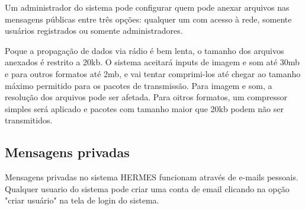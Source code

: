 \documentclass[11pt,a4paper]{article}
\begin{document}
Um administrador do sistema pode configurar quem pode anexar arquivos nas mensagens públicas entre três opções: qualquer um com acesso à rede, somente usuários registrados ou somente administradores.



Poque a propagação de dados via rádio é bem lenta, o tamanho dos arquivos anexados é restrito a 20kb. O sistema aceitará inputs de imagem e som até 30mb e para outros formatos até 2mb, e vai tentar comprimi-los até chegar ao tamanho máximo permitido para os pacotes de transmissão. Para imagem e som, a resolução dos arquivos pode ser afetada. Para oitros formatos, um compressor simples será aplicado e pacotes com tamanho maior que 20kb podem não ser transmitidos. 




\subsection{Mensagens privadas}

Mensagens privadas no sistema HERMES funcionam através de e-mails pessoais. Qualquer usuario do sistema pode criar uma conta de email clicando na opção "criar usuário" na tela de login do sistema.
\end{document}
